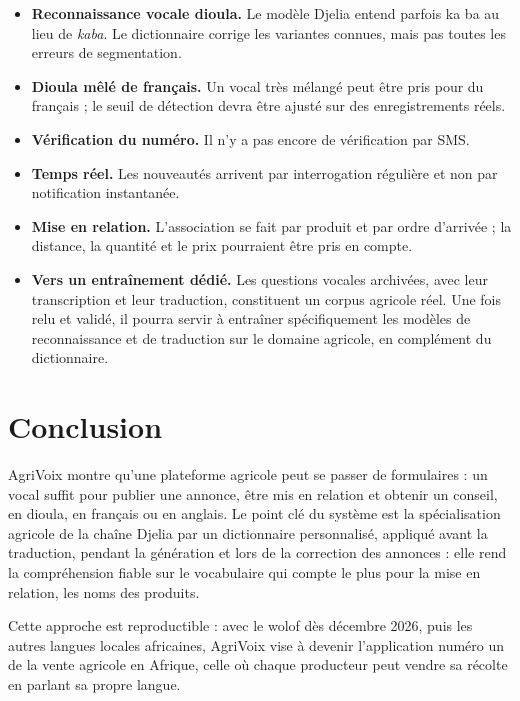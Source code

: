 \documentclass[12pt,a4paper]{article}
\begin{document}
\begin{itemize}
  \item \textbf{Reconnaissance vocale dioula.} Le modèle Djelia entend parfois \og ka ba \fg{} au lieu
  de \textit{kaba}. Le dictionnaire corrige les variantes connues, mais pas toutes les erreurs de
  segmentation.
  \item \textbf{Dioula mêlé de français.} Un vocal très mélangé peut être pris pour du français ; le
  seuil de détection devra être ajusté sur des enregistrements réels.
  \item \textbf{Vérification du numéro.} Il n'y a pas encore de vérification par SMS.
  \item \textbf{Temps réel.} Les nouveautés arrivent par interrogation régulière et non par
  notification instantanée.
  \item \textbf{Mise en relation.} L'association se fait par produit et par ordre d'arrivée ; la
  distance, la quantité et le prix pourraient être pris en compte.
  \item \textbf{Vers un entraînement dédié.} Les questions vocales archivées, avec leur transcription
  et leur traduction, constituent un corpus agricole réel. Une fois relu et validé, il pourra servir
  à entraîner spécifiquement les modèles de reconnaissance et de traduction sur le domaine agricole,
  en complément du dictionnaire.
\end{itemize}

\section{Conclusion}

AgriVoix montre qu'une plateforme agricole peut se passer de formulaires : un vocal suffit pour
publier une annonce, être mis en relation et obtenir un conseil, en dioula, en français ou en anglais.
Le point clé du système est la spécialisation agricole de la chaîne Djelia par un dictionnaire
personnalisé, appliqué avant la traduction, pendant la génération et lors de la correction des
annonces : elle rend la compréhension fiable sur le vocabulaire qui compte le plus pour la mise en
relation, les noms des produits.

Cette approche est reproductible : avec le wolof dès décembre 2026, puis les autres langues locales
africaines, AgriVoix vise à devenir l'application numéro un de la vente agricole en Afrique, celle
où chaque producteur peut vendre sa récolte en parlant sa propre langue.
\end{document}
